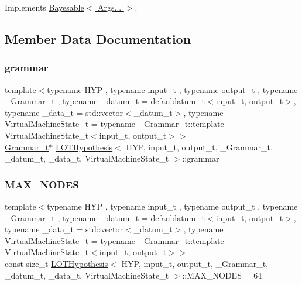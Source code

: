 Implements \hyperlink{class_bayesable_afcea9b439bcf321d5354710d8861cb54}{Bayesable$<$ Args... $>$}.



\subsection{Member Data Documentation}
\mbox{\label{class_l_o_t_hypothesis_affae32db28c39df676809ae47e14e7cf}} 
\subsubsection{\texorpdfstring{grammar}{grammar}}
{\footnotesize\ttfamily template$<$typename H\+YP , typename input\+\_\+t , typename output\+\_\+t , typename \+\_\+\+Grammar\+\_\+t , typename \+\_\+datum\+\_\+t  = defauldatum\+\_\+t$<$input\+\_\+t, output\+\_\+t$>$, typename \+\_\+data\+\_\+t  = std\+::vector$<$\+\_\+datum\+\_\+t$>$, typename Virtual\+Machine\+State\+\_\+t  = typename \+\_\+\+Grammar\+\_\+t\+::template Virtual\+Machine\+State\+\_\+t$<$input\+\_\+t, output\+\_\+t$>$$>$ \\
\hyperlink{class_l_o_t_hypothesis_a8006204013d471860e54c49d19edbace}{Grammar\+\_\+t}$\ast$ \hyperlink{class_l_o_t_hypothesis}{L\+O\+T\+Hypothesis}$<$ H\+YP, input\+\_\+t, output\+\_\+t, \+\_\+\+Grammar\+\_\+t, \+\_\+datum\+\_\+t, \+\_\+data\+\_\+t, Virtual\+Machine\+State\+\_\+t $>$\+::grammar}

\mbox{\label{class_l_o_t_hypothesis_a0231650d938c098118a4c4bdb201fc61}} 
\subsubsection{\texorpdfstring{M\+A\+X\+\_\+\+N\+O\+D\+ES}{MAX\_NODES}}
{\footnotesize\ttfamily template$<$typename H\+YP , typename input\+\_\+t , typename output\+\_\+t , typename \+\_\+\+Grammar\+\_\+t , typename \+\_\+datum\+\_\+t  = defauldatum\+\_\+t$<$input\+\_\+t, output\+\_\+t$>$, typename \+\_\+data\+\_\+t  = std\+::vector$<$\+\_\+datum\+\_\+t$>$, typename Virtual\+Machine\+State\+\_\+t  = typename \+\_\+\+Grammar\+\_\+t\+::template Virtual\+Machine\+State\+\_\+t$<$input\+\_\+t, output\+\_\+t$>$$>$ \\
const size\+\_\+t \hyperlink{class_l_o_t_hypothesis}{L\+O\+T\+Hypothesis}$<$ H\+YP, input\+\_\+t, output\+\_\+t, \+\_\+\+Grammar\+\_\+t, \+\_\+datum\+\_\+t, \+\_\+data\+\_\+t, Virtual\+Machine\+State\+\_\+t $>$\+::M\+A\+X\+\_\+\+N\+O\+D\+ES = 64\hspace{0.3cm}{\ttfamily [static]}}


